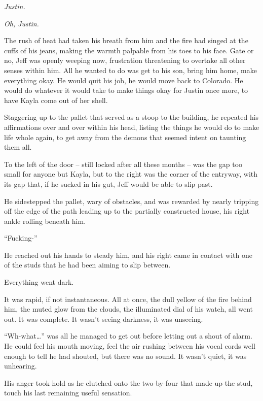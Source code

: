\textit{Justin.}

\textit{Oh, Justin.}


\secdiv

The rush of heat had taken his breath from him and the fire had singed at the cuffs of his jeans, making the warmth palpable from his toes to his face.  Gate or no, Jeff was openly weeping now, frustration threatening to overtake all other senses within him.  All he wanted to do was get to his son, bring him home, make everything okay.  He would quit his job, he would move back to Colorado.  He would do whatever it would take to make things okay for Justin once more, to have Kayla come out of her shell.

Staggering up to the pallet that served as a stoop to the building, he repeated his affirmations over and over within his head, listing the things he would do to make life whole again, to get away from the demons that seemed intent on taunting them all.

To the left of the door -- still locked after all these months -- was the gap too small for anyone but Kayla, but to the right was the corner of the entryway, with its gap that, if he sucked in his gut, Jeff would be able to slip past.

He sidestepped the pallet, wary of obstacles, and was rewarded by nearly tripping off the edge of the path leading up to the partially constructed house, his right ankle rolling beneath him.

``Fucking-''

He reached out his hands to steady him, and his right came in contact with one of the studs that he had been aiming to slip between.

Everything went dark.

It was rapid, if not instantaneous.  All at once, the dull yellow of the fire behind him, the muted glow from the clouds, the illuminated dial of his watch, all went out.  It was complete.  It wasn't seeing darkness, it was unseeing.

``Wh-what\ldots{}'' was all he managed to get out before letting out a shout of alarm.  He could feel his mouth moving, feel the air rushing between his vocal cords well enough to tell he had shouted, but there was no sound.  It wasn't quiet, it was unhearing.

His anger took hold as he clutched onto the two-by-four that made up the stud, touch his last remaining useful sensation.

